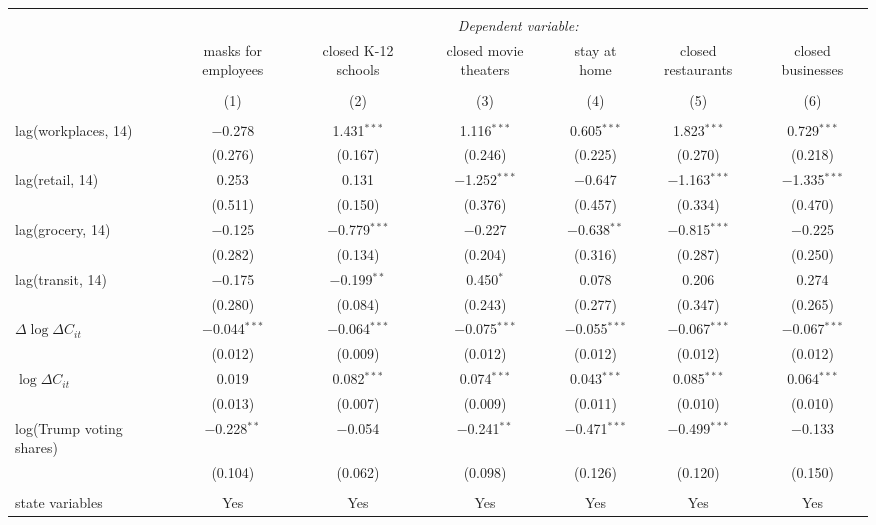 \begin{tabular}{@{\extracolsep{1pt}}lcccccc} 
\\[-1.8ex]\hline 
\hline \\[-1.8ex] 
 & \multicolumn{6}{c}{\textit{Dependent variable:}} \\ 
\cline{2-7} 
 & masks for employees & closed K-12 schools & closed movie theaters & stay at home & closed restaurants & closed businesses \\ 
\\[-1.8ex] & (1) & (2) & (3) & (4) & (5) & (6)\\ 
\hline \\[-1.8ex] 
 lag(workplaces, 14) & $-$0.278 & 1.431$^{***}$ & 1.116$^{***}$ & 0.605$^{***}$ & 1.823$^{***}$ & 0.729$^{***}$ \\ 
  & (0.276) & (0.167) & (0.246) & (0.225) & (0.270) & (0.218) \\ 
  lag(retail, 14) & 0.253 & 0.131 & $-$1.252$^{***}$ & $-$0.647 & $-$1.163$^{***}$ & $-$1.335$^{***}$ \\ 
  & (0.511) & (0.150) & (0.376) & (0.457) & (0.334) & (0.470) \\ 
  lag(grocery, 14) & $-$0.125 & $-$0.779$^{***}$ & $-$0.227 & $-$0.638$^{**}$ & $-$0.815$^{***}$ & $-$0.225 \\ 
  & (0.282) & (0.134) & (0.204) & (0.316) & (0.287) & (0.250) \\ 
  lag(transit, 14) & $-$0.175 & $-$0.199$^{**}$ & 0.450$^{*}$ & 0.078 & 0.206 & 0.274 \\ 
  & (0.280) & (0.084) & (0.243) & (0.277) & (0.347) & (0.265) \\ 
  $\Delta \log \Delta C_{it}$ & $-$0.044$^{***}$ & $-$0.064$^{***}$ & $-$0.075$^{***}$ & $-$0.055$^{***}$ & $-$0.067$^{***}$ & $-$0.067$^{***}$ \\ 
  & (0.012) & (0.009) & (0.012) & (0.012) & (0.012) & (0.012) \\ 
  $\log \Delta C_{it}$ & 0.019 & 0.082$^{***}$ & 0.074$^{***}$ & 0.043$^{***}$ & 0.085$^{***}$ & 0.064$^{***}$ \\ 
  & (0.013) & (0.007) & (0.009) & (0.011) & (0.010) & (0.010) \\ 
  log(Trump voting shares) & $-$0.228$^{**}$ & $-$0.054 & $-$0.241$^{**}$ & $-$0.471$^{***}$ & $-$0.499$^{***}$ & $-$0.133 \\ 
  & (0.104) & (0.062) & (0.098) & (0.126) & (0.120) & (0.150) \\ 
 \hline \\[-1.8ex] 
state variables & Yes & Yes & Yes & Yes & Yes & Yes \\ 

\end{tabular}
